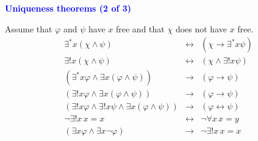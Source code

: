 \documentclass{slides}
\begin{document}
\begin{slide}

\begin{center}
\textcolor{blue}{\textbf{Uniqueness theorems (2 of 3)}}
\end{center}

Assume that $\varphi$ and $\psi$ have $x$
free and that $\chi$ does not have $x$ free.
\begin{eqnarray}
     \exists^\ast x ( \chi \wedge \psi ) & \leftrightarrow & ( \chi
\rightarrow \exists^\ast x \psi ) \label{moanimv} \\ %
      \exists{!} x ( \chi \wedge \psi ) & \leftrightarrow & ( \chi \wedge
\exists{!} x \psi ) \label{euanv} \\ %
   ( \exists^\ast x \varphi \wedge \exists x ( \varphi \wedge \psi ) )
& \rightarrow & ( \varphi \rightarrow \psi ) \label{mopick} \\ %
    ( \exists{!} x \varphi \wedge \exists x ( \varphi \wedge \psi ) )
& \rightarrow & ( \varphi \rightarrow \psi ) \label{eupick}  \\ %
   ( \exists{!} x \varphi \wedge \exists{!} x \psi \wedge \exists x (
\varphi \wedge \psi ) ) & \rightarrow &
( \varphi \leftrightarrow \psi) \label{eupickb} \\ %
   \lnot \exists{!} x \,x = x & \leftrightarrow & \lnot
    \forall x \,x = y  \label{exists1} \\ %
( \exists x \varphi \wedge \exists x \lnot \varphi ) & \rightarrow & \lnot
\exists{!} x \,x = x \label{exists2} %
\end{eqnarray}


\end{slide}
\end{document}
